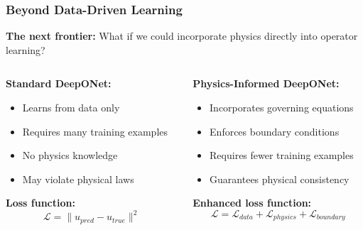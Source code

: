 \documentclass[notes]{beamer}
\begin{document}
\begin{frame}
\frametitle{Beyond Data-Driven Learning}

\textbf{The next frontier:} What if we could incorporate physics directly into operator learning?

\begin{columns}[T]
    \begin{column}{0.5\textwidth}
        \textbf{Standard DeepONet:}
        \begin{itemize}
            \item Learns from data only
            \item Requires many training examples
            \item No physics knowledge
            \item May violate physical laws
        \end{itemize}
        
        \vspace{0.5cm}
        
        \textbf{Loss function:}
        \begin{equation*}
        \mathcal{L} = \|u_{pred} - u_{true}\|^2
        \end{equation*}
    \end{column}
    \begin{column}{0.5\textwidth}
        \textbf{Physics-Informed DeepONet:}
        \begin{itemize}
            \item Incorporates governing equations
            \item Enforces boundary conditions
            \item Requires fewer training examples
            \item Guarantees physical consistency
        \end{itemize}
        
        \vspace{0.5cm}
        
        \textbf{Enhanced loss function:}
        \begin{equation*}
        \mathcal{L} = \mathcal{L}_{data} + \mathcal{L}_{physics} + \mathcal{L}_{boundary}
        \end{equation*}
    \end{column}
\end{columns}

\end{frame}
\end{document}
